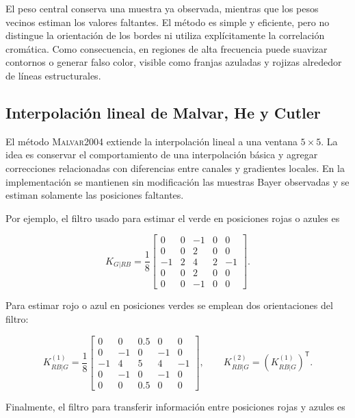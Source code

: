 \documentclass[11pt,a4paper]{article}
\newcommand{\malvar}{\textsc{Malvar2004}}
\begin{document}
El peso central conserva una muestra ya observada, mientras que los pesos vecinos estiman los valores faltantes. El método es simple y eficiente, pero no distingue la orientación de los bordes ni utiliza explícitamente la correlación cromática. Como consecuencia, en regiones de alta frecuencia puede suavizar contornos o generar falso color, visible como franjas azuladas y rojizas alrededor de líneas estructurales.

\subsection{Interpolación lineal de Malvar, He y Cutler}

El método \malvar{} \cite{malvar2004high} extiende la interpolación lineal a una ventana $5\times5$. La idea es conservar el comportamiento de una interpolación básica y agregar correcciones relacionadas con diferencias entre canales y gradientes locales. En la implementación se mantienen sin modificación las muestras Bayer observadas y se estiman solamente las posiciones faltantes.

Por ejemplo, el filtro usado para estimar el verde en posiciones rojas o azules es

\begin{equation}
 K_{G|RB}=\frac{1}{8}
 \begin{bmatrix}
 0&0&-1&0&0\\
 0&0&2&0&0\\
 -1&2&4&2&-1\\
 0&0&2&0&0\\
 0&0&-1&0&0
 \end{bmatrix}.
 \label{eq:malvar-green}
\end{equation}

Para estimar rojo o azul en posiciones verdes se emplean dos orientaciones del filtro:

\begin{equation}
 K_{RB|G}^{(1)}=\frac{1}{8}
 \begin{bmatrix}
 0&0&0.5&0&0\\
 0&-1&0&-1&0\\
 -1&4&5&4&-1\\
 0&-1&0&-1&0\\
 0&0&0.5&0&0
 \end{bmatrix},
 \qquad K_{RB|G}^{(2)}=\left(K_{RB|G}^{(1)}\right)^\mathsf{T}.
 \label{eq:malvar-green-rb}
\end{equation}

Finalmente, el filtro para transferir información entre posiciones rojas y azules es
\end{document}
